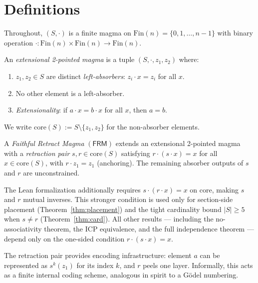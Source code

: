 \documentclass[a4paper,UKenglish,cleveref,autoref,thm-restate]{lipics-v2021}
\newcommand{\dotop}{\cdot}
\newcommand{\FRM}{\textsf{FRM}}
\newcommand{\Fin}{\mathrm{Fin}}
\newcommand{\core}{\mathrm{core}}
\begin{document}
\section{Definitions}
\label{sec:definitions}

Throughout, $(S, \dotop)$ is a finite magma on $\Fin(n) = \{0, 1, \ldots, n-1\}$ with binary operation $\dotop : \Fin(n) \times \Fin(n) \to \Fin(n)$.

\begin{definition}
\label{def:epm}
An \emph{extensional 2-pointed magma} is a tuple $(S, \dotop, z_1, z_2)$ where:
\begin{enumerate}
  \item $z_1, z_2 \in S$ are distinct \emph{left-absorbers}: $z_i \dotop x = z_i$ for all $x$.
  \item No other element is a left-absorber.
  \item \emph{Extensionality}: if $a \dotop x = b \dotop x$ for all $x$, then $a = b$.
\end{enumerate}
We write $\core(S) := S \setminus \{z_1, z_2\}$ for the non-absorber elements.
\end{definition}

\begin{definition}
\label{def:frm}
A \emph{Faithful Retract Magma} $(\FRM)$ extends an extensional 2-pointed magma with a \emph{retraction pair} $s, r \in \core(S)$ satisfying $r \dotop (s \dotop x) = x$ for all $x \in \core(S)$, with $r \dotop z_1 = z_1$ (anchoring). The remaining absorber outputs of $s$ and $r$ are unconstrained.
\end{definition}

\begin{remark}
The Lean formalization additionally requires $s \dotop (r \dotop x) = x$ on core, making $s$ and $r$ mutual inverses. This stronger condition is used only for section-side placement (Theorem~\ref{thm:placement}) and the tight cardinality bound $|S| \geq 5$ when $s \neq r$ (Theorem~\ref{thm:card}). All other results --- including the no-associativity theorem, the ICP equivalence, and the full independence theorem --- depend only on the one-sided condition $r \dotop (s \dotop x) = x$.
\end{remark}

The retraction pair provides encoding infrastructure: element $a$ can be represented as $s^k(z_1)$ for its index $k$, and $r$ peels one layer. Informally, this acts as a finite internal coding scheme, analogous in spirit to a G\"odel numbering.
\end{document}
